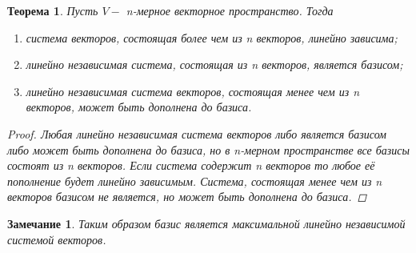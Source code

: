 \documentclass[main.tex]{subfiles}
\begin{document}
\newtheorem*{t3}{Теорема}
\begin{t3}
Пусть $V-$ n-мерное векторное пространство. Тогда
\begin{enumerate}
\item система векторов, состоящая более чем из n векторов, линейно зависима;
\item линейно независимая система, состоящая из n векторов, является базисом;
\item линейно независимая система векторов, состоящая менее чем из n векторов, может быть дополнена до базиса.
\end{enumerate}
\begin{proof}
 Любая линейно независимая система векторов либо является базисом либо может быть дополнена до базиса, но в n-мерном пространстве все базисы состоят из n векторов.
Если система содержит n векторов то любое её пополнение будет линейно зависимым.
Система, состоящая менее чем из n векторов базисом не является, но может быть дополнена до базиса.
\end{proof}   
\end{t3}


\newtheorem*{Comment}{Замечание}
\begin{Comment}
Таким образом базис является максимальной линейно независимой системой векторов.
\end{Comment}
\end{document}
